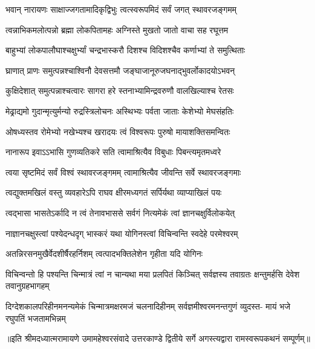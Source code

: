 

\addtocounter{shlokacount}{62}

\twolineshloka
{भवान् नारायणः साक्षाज्जगतामादिकृद्विभुः}
{त्वत्स्वरूपमिदं सर्वं जगत् स्थावरजङ्गमम्} %

\twolineshloka
{त्वन्नाभिकमलोत्पन्नो ब्रह्मा लोकपितामहः}
{अग्निस्ते मुखतो जातो वाचा सह रघूत्तम} %

\twolineshloka
{बाहुभ्यां लोकपालौघाश्चक्षुर्भ्यां चन्द्रभास्करौ}
{दिशश्च विदिशश्चैव कर्णाभ्यां ते समुत्थिताः} %

\twolineshloka
{घ्राणात् प्राणः समुत्पन्नश्चाश्विनौ देवसत्तमौ}
{जङ्घाजानूरुजघनाद्भुवर्लोकादयोऽभवन्} %

\twolineshloka
{कुक्षिदेशात् समुत्पन्नाश्चत्वारः सागरा हरे}
{स्तनाभ्यामिन्द्रवरुणौ वालखिल्याश्च रेतसः} %

\twolineshloka
{मेढ्राद्यमो गुदान्मृत्युर्मन्यो रुद्रस्त्रिलोचनः}
{अस्थिभ्यः पर्वता जाताः केशेभ्यो मेघसंहतिः} %

\twolineshloka
{ओषध्यस्तव रोमेभ्यो नखेभ्यश्च खरादयः}
{त्वं विश्वरूपः पुरुषो मायाशक्तिसमन्वितः} %

\twolineshloka
{नानारूप इवाऽऽभासि गुणव्यतिकरे सति}
{त्वामाश्रित्यैव विबुधाः पिबन्त्यमृतमध्वरे} %

\twolineshloka
{त्वया सृष्टमिदं सर्वं विश्वं स्थावरजङ्गमम्}
{त्वामाश्रित्यैव जीवन्ति सर्वे स्थावरजङ्गमाः} %

\twolineshloka
{त्वद्युक्तमखिलं वस्तु व्यवहारेऽपि राघव}
{क्षीरमध्यगतं सर्पिर्यथा व्याप्याखिलं पयः} %

\twolineshloka
{त्वद्भासा भासतेऽर्कादि न त्वं तेनावभाससे}
{सर्वगं नित्यमेकं त्वां ज्ञानचक्षुर्विलोकयेत्} %

\twolineshloka
{नाज्ञानचक्षुस्त्वां पश्येदन्धदृग् भास्करं यथा}
{योगिनस्त्वां विचिन्वन्ति स्वदेहे परमेश्वरम्} %

\twolineshloka
{अतन्निरसनमुखैर्वेदशीर्षैरहर्निशम्}
{त्वत्पादभक्तिलेशेन गृहीता यदि योगिनः} %

\threelineshloka
{विचिन्वन्तो हि पश्यन्ति चिन्मात्रं त्वां न चान्यथा}
{मया प्रलपितं किञ्चित् सर्वज्ञस्य तवाग्रतः}
{क्षन्तुमर्हसि देवेश तवानुग्रहभागहम्} %

\fourlineindentedshloka
{दिग्देशकालपरिहीनमनन्यमेकं}
{चिन्मात्रमक्षरमजं चलनादिहीनम्}
{सर्वज्ञमीश्वरमनन्तगुणं व्युदस्त-}
{मायं भजे रघुपतिं भजतामभिन्नम्} %


{॥इति श्रीमदध्यात्मरामायणे उमामहेश्वरसंवादे उत्तरकाण्डे द्वितीये  सर्गे
अगस्त्यद्वारा  रामस्वरूपकथनं सम्पूर्णम्॥}
